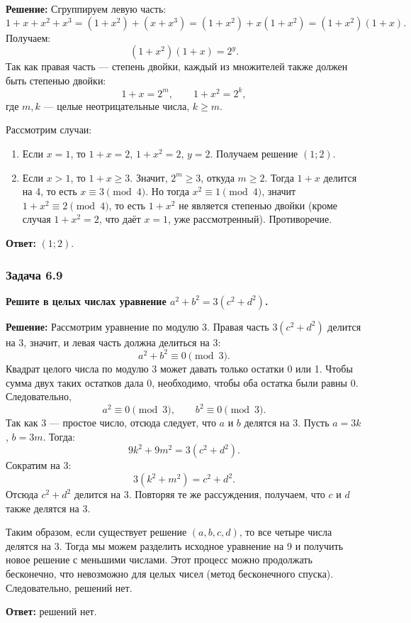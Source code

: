 \documentclass[12pt, a4paper]{article}
\begin{document}
\textbf{Решение:}
Сгруппируем левую часть:
\[
1 + x + x^2 + x^3 = (1 + x^2) + (x + x^3) = (1 + x^2) + x(1 + x^2) = (1 + x^2)(1 + x).
\]
Получаем:
\[
(1 + x^2)(1 + x) = 2^y.
\]
Так как правая часть — степень двойки, каждый из множителей также должен быть степенью двойки:
\[
1 + x = 2^m, \qquad 1 + x^2 = 2^k,
\]
где $m, k$ — целые неотрицательные числа, $k \ge m$.

Рассмотрим случаи:
\begin{enumerate}
    \item Если $x = 1$, то $1 + x = 2$, $1 + x^2 = 2$, $y = 2$. Получаем решение $(1; 2)$.
    \item Если $x > 1$, то $1 + x \ge 3$. Значит, $2^m \ge 3$, откуда $m \ge 2$. Тогда $1 + x$ делится на 4, то есть $x \equiv 3 \pmod{4}$. Но тогда $x^2 \equiv 1 \pmod{4}$, значит $1 + x^2 \equiv 2 \pmod{4}$, то есть $1 + x^2$ не является степенью двойки (кроме случая $1 + x^2 = 2$, что даёт $x = 1$, уже рассмотренный). Противоречие.
\end{enumerate}

\textbf{Ответ:} $(1; 2)$.

\subsubsection*{Задача 6.9}
\textbf{Решите в целых числах уравнение $a^2 + b^2 = 3(c^2 + d^2)$.}

\textbf{Решение:}
Рассмотрим уравнение по модулю 3. Правая часть $3(c^2 + d^2)$ делится на 3, значит, и левая часть должна делиться на 3:
\[
a^2 + b^2 \equiv 0 \pmod{3}.
\]
Квадрат целого числа по модулю 3 может давать только остатки 0 или 1. Чтобы сумма двух таких остатков дала 0, необходимо, чтобы оба остатка были равны 0. Следовательно,
\[
a^2 \equiv 0 \pmod{3}, \qquad b^2 \equiv 0 \pmod{3}.
\]
Так как 3 — простое число, отсюда следует, что $a$ и $b$ делятся на 3. Пусть $a = 3k$, $b = 3m$. Тогда:
\[
9k^2 + 9m^2 = 3(c^2 + d^2).
\]
Сократим на 3:
\[
3(k^2 + m^2) = c^2 + d^2.
\]
Отсюда $c^2 + d^2$ делится на 3. Повторяя те же рассуждения, получаем, что $c$ и $d$ также делятся на 3.

Таким образом, если существует решение $(a, b, c, d)$, то все четыре числа делятся на 3. Тогда мы можем разделить исходное уравнение на 9 и получить новое решение с меньшими числами. Этот процесс можно продолжать бесконечно, что невозможно для целых чисел (метод бесконечного спуска). Следовательно, решений нет.

\textbf{Ответ:} решений нет.
\end{document}
